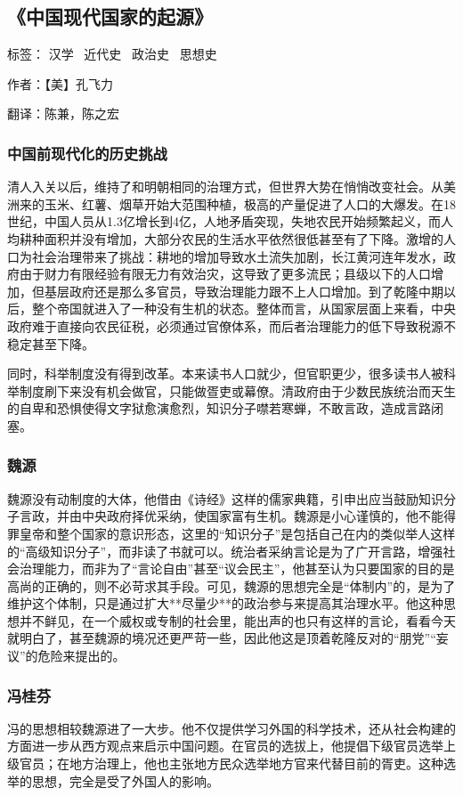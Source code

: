 \subsection{《中国现代国家的起源》}

标签： 汉学 \  近代史 \  政治史 \  思想史

作者：【美】孔飞力

翻译：陈兼，陈之宏

\subsubsection{中国前现代化的历史挑战}
清人入关以后，维持了和明朝相同的治理方式，但世界大势在悄悄改变社会。从美洲来的玉米、红薯、烟草开始大范围种植，极高的产量促进了人口的大爆发。在18世纪，中国人员从1.3亿增长到4亿，人地矛盾突现，失地农民开始频繁起义，而人均耕种面积并没有增加，大部分农民的生活水平依然很低甚至有了下降。激增的人口为社会治理带来了挑战：耕地的增加导致水土流失加剧，长江黄河连年发水，政府由于财力有限经验有限无力有效治灾，这导致了更多流民；县级以下的人口增加，但基层政府还是那么多官员，导致治理能力跟不上人口增加。到了乾隆中期以后，整个帝国就进入了一种没有生机的状态。整体而言，从国家层面上来看，中央政府难于直接向农民征税，必须通过官僚体系，而后者治理能力的低下导致税源不稳定甚至下降。

同时，科举制度没有得到改革。本来读书人口就少，但官职更少，很多读书人被科举制度刷下来没有机会做官，只能做疍吏或幕僚。清政府由于少数民族统治而天生的自卑和恐惧使得文字狱愈演愈烈，知识分子噤若寒蝉，不敢言政，造成言路闭塞。

\subsubsection{魏源}

魏源没有动制度的大体，他借由《诗经》这样的儒家典籍，引申出应当鼓励知识分子言政，并由中央政府择优采纳，使国家富有生机。魏源是小心谨慎的，他不能得罪皇帝和整个国家的意识形态，这里的“知识分子”是包括自己在内的类似举人这样的“高级知识分子”，而非读了书就可以。统治者采纳言论是为了广开言路，增强社会治理能力，而非为了“言论自由”甚至“议会民主”，他甚至认为只要国家的目的是高尚的正确的，则不必苛求其手段。可见，魏源的思想完全是“体制内”的，是为了维护这个体制，只是通过扩大**尽量少**的政治参与来提高其治理水平。他这种思想并不鲜见，在一个威权或专制的社会里，能出声的也只有这样的言论，看看今天就明白了，甚至魏源的境况还更严苛一些，因此他这是顶着乾隆反对的“朋党”“妄议”的危险来提出的。

\subsubsection{冯桂芬}
冯的思想相较魏源进了一大步。他不仅提供学习外国的科学技术，还从社会构建的方面进一步从西方观点来启示中国问题。在官员的选拔上，他提倡下级官员选举上级官员；在地方治理上，他也主张地方民众选举地方官来代替目前的胥吏。这种选举的思想，完全是受了外国人的影响。

